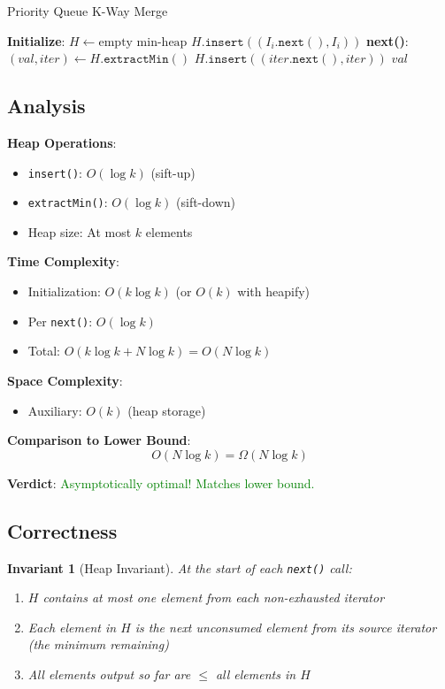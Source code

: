 \documentclass[11pt]{article}
\newtheorem{invariant}{Invariant}
\begin{document}
\begin{algorithm}
\caption{Priority Queue K-Way Merge}
\begin{algorithmic}[1]
\State \textbf{Initialize}:
\State $H \gets \text{empty min-heap}$
        \State $H.\texttt{insert}((I_i.\texttt{next}(), I_i))$
    \EndIf
\EndFor
\State
\State \textbf{next()}:
\State $(val, iter) \gets H.\texttt{extractMin}()$
    \State $H.\texttt{insert}((iter.\texttt{next}(), iter))$
\EndIf
\State \Return $val$
\end{algorithmic}
\end{algorithm}

\subsection{Analysis}

\textbf{Heap Operations}:
\begin{itemize}
    \item \texttt{insert()}: $O(\log k)$ (sift-up)
    \item \texttt{extractMin()}: $O(\log k)$ (sift-down)
    \item Heap size: At most $k$ elements
\end{itemize}

\textbf{Time Complexity}:
\begin{itemize}
    \item Initialization: $O(k \log k)$ (or $O(k)$ with heapify)
    \item Per \texttt{next()}: $O(\log k)$
    \item Total: $O(k \log k + N \log k) = O(N \log k)$
\end{itemize}

\textbf{Space Complexity}:
\begin{itemize}
    \item Auxiliary: $O(k)$ (heap storage)
\end{itemize}

\textbf{Comparison to Lower Bound}:
\[
O(N \log k) = \Omega(N \log k)
\]

\textbf{Verdict}: \textcolor{green}{Asymptotically optimal! Matches lower bound.}

\subsection{Correctness}

\begin{invariant}[Heap Invariant]
At the start of each \texttt{next()} call:
\begin{enumerate}
    \item $H$ contains at most one element from each non-exhausted iterator
    \item Each element in $H$ is the next unconsumed element from its source iterator (the minimum remaining)
    \item All elements output so far are $\leq$ all elements in $H$
\end{enumerate}
\end{invariant}
\end{document}
